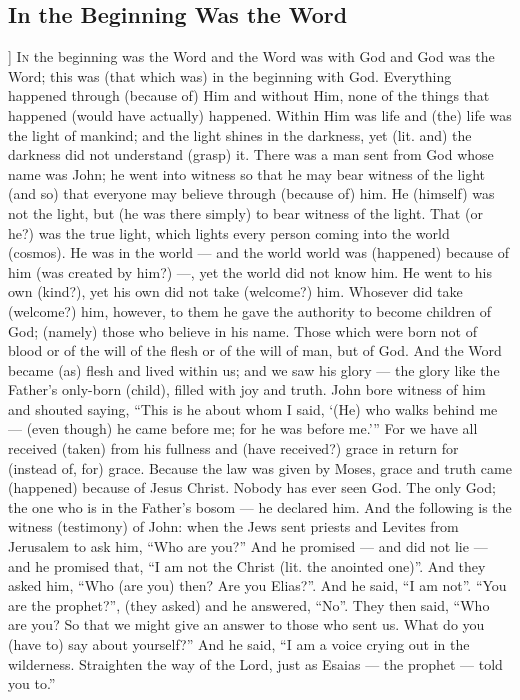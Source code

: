 \begin{pages}
\begin{Leftside}
        			\chapter{In the Beginning Was the Word}
        			]
        		\renewcommand\LettrineFontHook{\Zallmanfamily}
		\lettrine[lines=3]{I}{n} the beginning was the Word and the Word was with God and God was the Word; this was (that which was) in the beginning with God. Everything happened through (because of) Him and without Him, none of the things that happened (would have actually) happened. Within Him was life and (the) life was the light of mankind; and the light shines in the darkness, yet (lit. and) the darkness did not understand (grasp) it. 
		\pend
		\pstart
		There was a man sent from God whose name was John; he went into witness so that he may bear witness of the light (and so) that everyone may believe through (because of) him. He (himself) was not the light, but (he was there simply) to bear witness of the light. That (or he?) was the true light, which lights every person coming into the world (cosmos). He was in the world — and the world world was (happened) because of him (was created by him?) —, yet the world did not know him. He went to his own (kind?), yet his own did not take (welcome?) him. Whosever did take (welcome?) him, however, to them he gave the authority to become children of God; (namely) those who believe in his name. Those which were born not of blood or of the will of the flesh or of the will of man, but of God. 
		\pend
		\pstart
		And the Word became (as) flesh and lived within us; and we saw his glory — the glory like the Father’s only-born (child), filled with joy and truth. John bore witness of him and shouted saying, “This is he about whom I said, ‘(He) who walks behind me — (even though) he came before me; for he was before me.’” For we have all received (taken) from his fullness and (have received?) grace in return for (instead of, for) grace. Because the law was given by Moses, grace and truth came (happened) because of Jesus Christ. Nobody has ever seen God. The only God; the one who is in the Father’s bosom — he declared him. 
		\pend
		\pstart
		And the following is the witness (testimony) of John: when the Jews sent priests and Levites from Jerusalem to ask him, “Who are you?” And he promised — and did not lie — and he promised that, “I am not the Christ (lit. the anointed one)”. And they asked him, “Who (are you) then? Are you Elias?”. And he said, “I am not”. “You are the prophet?”, (they asked) and he answered, “No”. They then said, “Who are you? So that we might give an answer to those who sent us. What do you (have to) say about yourself?” And he said, “I am a voice crying out in the wilderness. Straighten the way of the Lord, just as Esaias — the prophet — told you to.” 

\end{Leftside}
\end{pages}
